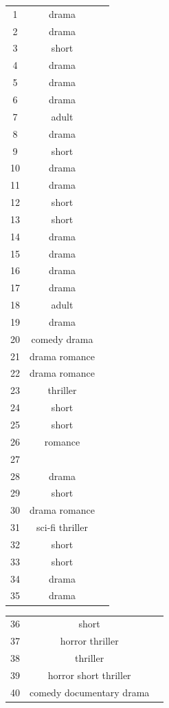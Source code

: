 \documentclass{article}
\begin{document}
\begin {table}[htbp]
\begin{adjustbox}{center}
\begin{tabular}{|c|c|c}
1 & drama\\
2 & drama\\
3& short\\
4&drama\\
5&drama\\
6&drama\\
7&adult\\
8&drama\\
9&short\\
10&drama\\
11&drama\\
12&short\\
13&short\\
14&drama\\
15&drama\\
16&drama\\
17&drama\\
18&adult\\
19&drama\\
20&comedy drama\\
21&drama romance\\
22&drama romance\\
23&thriller\\
24&short\\
25&short\\
26&romance\\
27&\\
28&drama\\
29&short\\
30&drama romance\\
31&sci-fi thriller\\
32& short\\
33& short\\
34& drama\\
35& drama\\
\end{tabular}
\begin{tabular}{|c|c|c}
36& short\\
37&horror thriller\\
38& thriller\\
39& horror short thriller\\
40& comedy documentary drama\\


\end{tabular}
\end{adjustbox}
\end{table}
\end{document}

